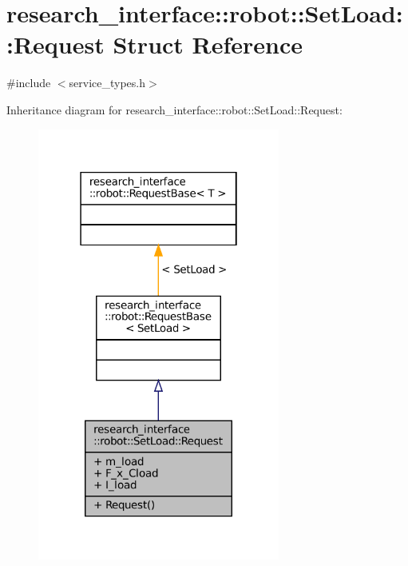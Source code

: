 \hypertarget{structresearch__interface_1_1robot_1_1SetLoad_1_1Request}{}\section{research\+\_\+interface\+:\+:robot\+:\+:Set\+Load\+:\+:Request Struct Reference}
\label{structresearch__interface_1_1robot_1_1SetLoad_1_1Request}


{\ttfamily \#include $<$service\+\_\+types.\+h$>$}



Inheritance diagram for research\+\_\+interface\+:\+:robot\+:\+:Set\+Load\+:\+:Request\+:
\nopagebreak
\begin{figure}[H]
\begin{center}
\leavevmode
\includegraphics[width=226pt]{structresearch__interface_1_1robot_1_1SetLoad_1_1Request__inherit__graph}
\end{center}
\end{figure}


